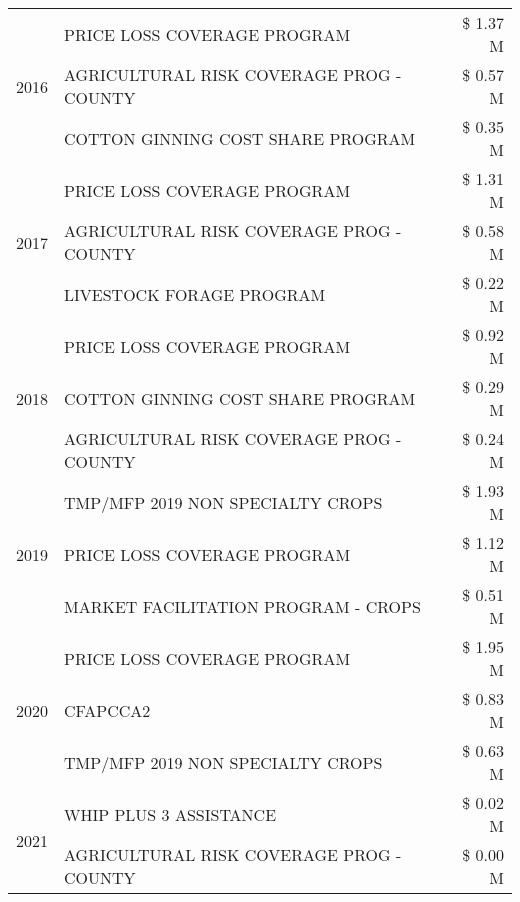 \begin{tabular}{llr}
\cline{1-3}
\multirow[t]{3}{*}{2016} & PRICE LOSS COVERAGE PROGRAM                   & \$ 1.37 M \\
 & AGRICULTURAL RISK COVERAGE PROG - COUNTY      & \$ 0.57 M \\
 & COTTON GINNING COST SHARE PROGRAM             & \$ 0.35 M \\
\cline{1-3}
\multirow[t]{3}{*}{2017} & PRICE LOSS COVERAGE PROGRAM & \$ 1.31 M \\
 & AGRICULTURAL RISK COVERAGE PROG - COUNTY & \$ 0.58 M \\
 & LIVESTOCK FORAGE PROGRAM & \$ 0.22 M \\
\cline{1-3}
\multirow[t]{3}{*}{2018} & PRICE LOSS COVERAGE PROGRAM & \$ 0.92 M \\
 & COTTON GINNING COST SHARE PROGRAM & \$ 0.29 M \\
 & AGRICULTURAL RISK COVERAGE PROG - COUNTY & \$ 0.24 M \\
\cline{1-3}
\multirow[t]{3}{*}{2019} & TMP/MFP 2019 NON SPECIALTY CROPS & \$ 1.93 M \\
 & PRICE LOSS COVERAGE PROGRAM & \$ 1.12 M \\
 & MARKET FACILITATION PROGRAM - CROPS & \$ 0.51 M \\
\cline{1-3}
\multirow[t]{3}{*}{2020} & PRICE LOSS COVERAGE PROGRAM & \$ 1.95 M \\
 & CFAPCCA2 & \$ 0.83 M \\
 & TMP/MFP 2019 NON SPECIALTY CROPS & \$ 0.63 M \\
\cline{1-3}
\multirow[t]{2}{*}{2021} & WHIP PLUS 3 ASSISTANCE & \$ 0.02 M \\
 & AGRICULTURAL RISK COVERAGE PROG - COUNTY & \$ 0.00 M \\
\cline{1-3}
\bottomrule
\end{tabular}
